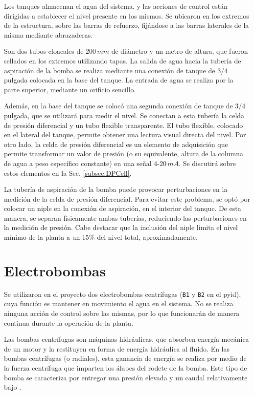 Los tanques almacenan el agua del sistema, y las acciones de
control están dirigidas a establecer el nivel presente en los mismos.
Se ubicaron en los extremos de la estructura, sobre las barras de 
refuerzo, fijándose a las barras laterales de la misma mediante
abrazaderas.

Son dos tubos cloacales de $200\,mm$ de diámetro y un metro de altura, que
fueron sellados en los extremos utilizando tapas.
La salida de agua hacia la tubería de aspiración de la bomba se realiza
mediante una conexión de tanque de 3/4 pulgada colocada en la base del tanque.
La entrada de agua se realiza por la parte superior, mediante un orificio
sencillo.

Además, en la base del tanque se colocó una segunda conexión de tanque de 3/4
pulgada, que se utilizará para medir el nivel.
Se conectan a esta tubería la celda de presión diferencial y un tubo
flexible transparente.
El tubo flexible, colocado en el lateral del tanque, permite obtener una
lectura visual directa del nivel.
Por otro lado, la celda de presión diferencial es un elemento de adquisición
que permite transformar un valor de presión (o su equivalente, altura de la
columna de agua a peso específico constante) en
una señal $4$-$20\,mA$.
Se discutirá sobre estos elementos en la Sec. \ref{subsec:DPCell}.

La tubería de aspiración de la bomba puede provocar
perturbaciones en la medición de la celda de presión diferencial.
Para evitar este problema, se optó por
colocar un niple en la conexión de aspiración, en el interior del tanque.
De esta manera, se separan físicamente ambas tuberías, reduciendo las
perturbaciones en la medición de presión.
Cabe destacar que la inclusión del niple limita el nivel mínimo de la planta a
un 15\% del nivel total, aproximadamente.

\section{Electrobombas}
\label{sec:Bombas}

Se utilizaron en el proyecto dos electrobombas centrífugas (\verb|B1| y
\verb|B2| en el \gls{pyid}), cuya función es
mantener en movimiento el agua en el sistema.
No se realiza ninguna acción de control sobre las
mismas, por lo que funcionarán de manera continua durante la operación de la
planta.

Las bombas centrífugas son máquinas hidráulicas, que absorben energía mecánica
de un motor y la restituyen en forma de energía hidráulica al fluido.
En las bombas centrífugas (o radiales), esta ganancia de energía se realiza por
medio de la fuerza centrífuga que imparten los álabes del rodete de la bomba.
Este tipo de bomba se caracteriza por entregar una presión elevada y un caudal
relativamente bajo \cite{bib:Mataix}.

